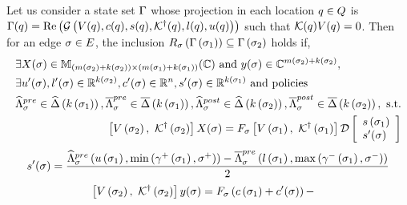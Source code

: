 \begin{lemma}
  Let us consider a state set $\Gamma$ whose projection in each
  location $q\in Q$ is $\Gamma(q) =
  \operatorname{\operatorname{Re}}\left(\mathcal{G}\left(V(q),c(q),s(q),\mathcal{K}^\dagger(q),l(q),u(q)\right)\right)$
  such that $\mathcal{K}(q)V(q) = 0$.  Then for an edge
  $\sigma\in E$, the inclusion
  $R_{\sigma}\left(\Gamma\left(\sigma_{1}\right)\right)
  \subseteq \Gamma\left(\sigma_{2}\right)$ holds if,
\begin{align}
\begin{split}
& \exists X(\sigma)\in
\mathbb{M}_{\left(m\left(\sigma_{2}\right)+k\left(\sigma_{2}\right)\right)\times \left(m\left(\sigma_{1}\right)+k\left(\sigma_{1}\right)\right)}(\mathbb{\mathbb{C}})~\text{and}~y(\sigma)\in
\mathbb{C}^{m\left(\sigma_{2}\right)+k\left(\sigma_{2}\right)},\\
& \exists u^\prime(\sigma),l^\prime(\sigma)\in \mathbb{R}^{k\left(\sigma_{2}\right)}, c^\prime(\sigma)\in\mathbb{R}^n,s^\prime(\sigma)\in\mathbb{R}^{k\left(\sigma_{1}\right)}~\text{and policies}\\
&\widehat{\Lambda}_{\sigma}^{pre}\in\widehat{\Delta}\left(k\left(\sigma_{1}\right)\right),\overline{\Lambda}_{\sigma}^{pre}\in\overline{\Delta}\left(k\left(\sigma_{1}\right)\right),
\widehat{\Lambda}_{\sigma}^{post}\in\widehat{\Delta}\left(k\left(\sigma_{2}\right)\right),\overline{\Lambda}_{\sigma}^{post}\in\overline{\Delta}\left(k\left(\sigma_{2}\right)\right),~\text{s.t.}
\end{split}\\
\begin{split}
& \left[V\left(\sigma_{2}\right),~\mathcal{K}^\dagger\left(\sigma_{2}\right)\right]X(\sigma) = F_{\sigma}\left[V\left(\sigma_{1}\right),~\mathcal{K}^\dagger\left(\sigma_{1}\right)\right]\mathcal{D}
\left[\begin{array}{l}{s\left(\sigma_{1}\right)}\\{s^\prime(\sigma)} \end{array}\right]\\
\end{split}
\end{align}
\begin{align}
\begin{split}
s^\prime(\sigma) = \frac{\widehat{\Lambda}_{\sigma}^{pre}\left(u\left(\sigma_{1}\right),\min\left(\gamma^+\left(\sigma_{1}\right),\sigma^+\right)\right)-
\overline{\Lambda}_{\sigma}^{pre}\left(l\left(\sigma_{1}\right),\max\left(\gamma^-\left(\sigma_{1}\right),\sigma^-\right)\right)}{2}\\
\end{split}
\end{align}
\begin{align}
\begin{split}
& \lt[V\lt(\postloc{\edge}\rt),~\pinv{\ptemplate}\lt(\postloc{\edge}\rt)\rt]y(\edge) = \reset{\edge}\lt(c\lt(\preloc{\edge}\rt)+c^\pr(\edge)\rt)- 

\end{split}
\end{align}
\end{lemma}
